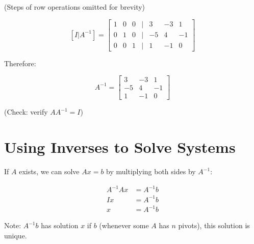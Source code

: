\documentclass[12pt,a4paper]{article}
\begin{document}
(Steps of row operations omitted for brevity)

\[
[I|A^{-1}] = \begin{bmatrix} 
1 & 0 & 0 & | & 3 & -3 & 1 \\
0 & 1 & 0 & | & -5 & 4 & -1 \\
0 & 0 & 1 & | & 1 & -1 & 0
\end{bmatrix}
\]

Therefore:

\[
A^{-1} = \begin{bmatrix} 
3 & -3 & 1 \\
-5 & 4 & -1 \\
1 & -1 & 0
\end{bmatrix}
\]

(Check: verify $AA^{-1} = I$)

\section{Using Inverses to Solve Systems}

If $A$ exists, we can solve $Ax = b$ by multiplying both sides by $A^{-1}$:

\begin{align*}
A^{-1}Ax &= A^{-1}b \\
Ix &= A^{-1}b \\
x &= A^{-1}b
\end{align*}

Note: $A^{-1}b$ has solution $x$ if $b$ (whenever some $A$ has $n$ pivots), this solution is unique.
\end{document}
